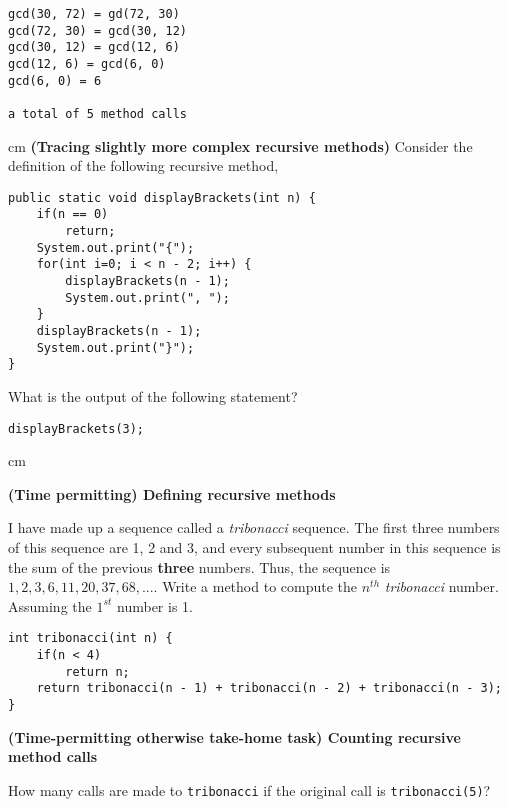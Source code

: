 \begin{questions}
\begin{solution}
\begin{verbatim}
gcd(30, 72) = gd(72, 30)
gcd(72, 30) = gcd(30, 12)
gcd(30, 12) = gcd(12, 6)
gcd(12, 6) = gcd(6, 0)
gcd(6, 0) = 6

a total of 5 method calls
\end{verbatim}
\end{solution}

\newpage

 cm \question  \textbf{(Tracing slightly more complex recursive methods)} \vskip 0.5cm
Consider the definition of the following recursive method,

\begin{lstlisting}
public static void displayBrackets(int n) {
	if(n == 0)
		return;
	System.out.print("{");
	for(int i=0; i < n - 2; i++) {
		displayBrackets(n - 1);
		System.out.print(", ");
	}
	displayBrackets(n - 1);
	System.out.print("}");	
}
\end{lstlisting}

What is the output of the following statement?

\begin{lstlisting}	
displayBrackets(3);
\end{lstlisting}
	
 cm

\question  \textbf{(Time permitting) Defining recursive methods} \vskip 0.5cm

I have made up a sequence called a \emph{tribonacci} sequence. 
The first three numbers of this sequence are 1, 2 and 3, and every subsequent number in this sequence is the sum of the previous \textbf{three} numbers. Thus, the sequence is $1, 2, 3, 6, 11, 20, 37, 68, ...$. Write a method to compute the $n^{th}$ \emph{tribonacci} number. Assuming the $1^{st}$ number is 1.

\begin{solution}
\begin{lstlisting}
int tribonacci(int n) {
	if(n < 4)
		return n;
	return tribonacci(n - 1) + tribonacci(n - 2) + tribonacci(n - 3);
}
\end{lstlisting}	
\end{solution}

\question  \textbf{(Time-permitting otherwise take-home task) Counting recursive method calls} \vskip 0.5cm

How many calls are made to \texttt{tribonacci} if the original call is \texttt{tribonacci(5)}?


\end{questions}
